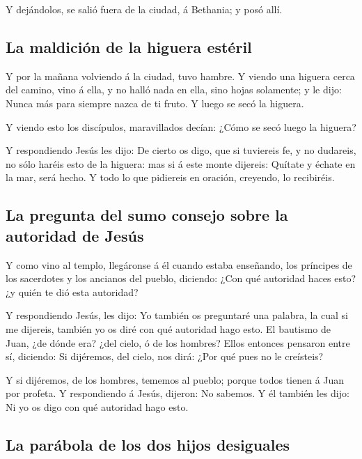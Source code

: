 Y dejándolos, se salió fuera de la ciudad, á Bethania; y
posó allí.

\hypertarget{la-maldiciuxf3n-de-la-higuera-estuxe9ril}{%
\subsection{La maldición de la higuera
estéril}\label{la-maldiciuxf3n-de-la-higuera-estuxe9ril}}

 Y por la mañana volviendo á la ciudad, tuvo hambre.
 Y viendo una higuera cerca del camino, vino á ella, y no
halló nada en ella, sino hojas solamente; y le dijo: Nunca más para
siempre nazca de ti fruto. Y luego se secó la higuera.

 Y viendo esto los discípulos, maravillados decían: ¿Cómo
se secó luego la higuera?

 Y respondiendo Jesús les dijo: De cierto os digo, que si
tuviereis fe, y no dudareis, no sólo haréis esto de la higuera: mas si á
este monte dijereis: Quítate y échate en la mar, será hecho.
 Y todo lo que pidiereis en oración, creyendo, lo
recibiréis.

\hypertarget{la-pregunta-del-sumo-consejo-sobre-la-autoridad-de-jesuxfas}{%
\subsection{La pregunta del sumo consejo sobre la autoridad de
Jesús}\label{la-pregunta-del-sumo-consejo-sobre-la-autoridad-de-jesuxfas}}

 Y como vino al templo, llegáronse á él cuando estaba
enseñando, los príncipes de los sacerdotes y los ancianos del pueblo,
diciendo: ¿Con qué autoridad haces esto? ¿y quién te dió esta autoridad?

 Y respondiendo Jesús, les dijo: Yo también os preguntaré
una palabra, la cual si me dijereis, también yo os diré con qué
autoridad hago esto.  El bautismo de Juan, ¿de dónde era?
¿del cielo, ó de los hombres? Ellos entonces pensaron entre sí,
diciendo: Si dijéremos, del cielo, nos dirá: ¿Por qué pues no le
creísteis?

 Y si dijéremos, de los hombres, tememos al pueblo;
porque todos tienen á Juan por profeta.  Y respondiendo á
Jesús, dijeron: No sabemos. Y él también les dijo: Ni yo os digo con qué
autoridad hago esto.

\hypertarget{la-paruxe1bola-de-los-dos-hijos-desiguales}{%
\subsection{La parábola de los dos hijos
desiguales}\label{la-paruxe1bola-de-los-dos-hijos-desiguales}}

